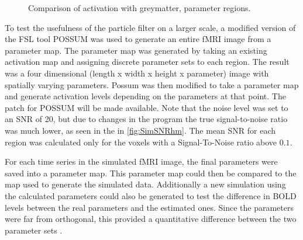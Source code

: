 \begin{figure}
\caption{Comparison of activation with greymatter, parameter regions.}
\label{fig:simslice_hm}
\end{figure}

To test the usefulness of the particle filter on a larger scale, a modified version
of the FSL tool
POSSUM was used to generate an entire \ac{fMRI} image from a parameter map. The parameter map was generated
by taking an existing activation map and assigning discrete parameter sets to each region.
The result was a four dimensional (length x width
x height x parameter) image with spatially varying parameters. Possum was then modified
to take a parameter map and generate activation levels depending on the parameters at that
point. The patch for POSSUM will be made available. Note that the noise
level was set to an SNR of 20, but due to changes
in the program the true signal-to-noise ratio was much lower, as seen in the
in \autoref{fig:SimSNRhm}. The mean SNR for each region was calculated only for the
voxels with a Signal-To-Noise ratio above $0.1$.

For each time series in the simulated \ac{fMRI} image, the final parameters were saved
into a parameter map. This parameter map could then be compared to the map used to generate the
simulated data. Additionally a new simulation using the calculated parameters could also be
generated to test the difference in \ac{BOLD} levels between the real parameters and the
estimated ones. Since the parameters were far from orthogonal,
 this provided a quantitative difference between the two parameter sets \cite{Deneux2006}.

